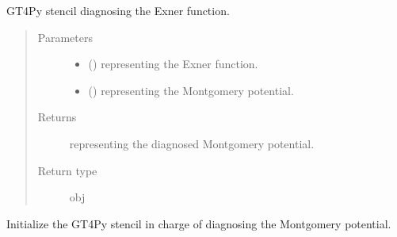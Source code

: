 \documentclass[letterpaper,10pt,english]{sphinxmanual}
\begin{document}
\begin{fulllineitems}
\begin{fulllineitems}
\begin{quote}
\begin{description}
\begin{itemize}
\end{itemize}

\end{description}\end{quote}

\end{fulllineitems}


\begin{fulllineitems}
\label{\detokenize{api:dycore.diagnostic_isentropic.DiagnosticIsentropic._stencil_diagnosing_montgomery_defs}}
GT4Py stencil diagnosing the Exner function.
\begin{quote}\begin{description}
\item[{Parameters}] \leavevmode\begin{itemize}
\item {} 
 () \textendash{}  representing the Exner function.

\item {} 
 () \textendash{}  representing the Montgomery potential.

\end{itemize}

\item[{Returns}] \leavevmode
{} representing the diagnosed Montgomery potential.

\item[{Return type}] \leavevmode
obj

\end{description}\end{quote}

\end{fulllineitems}


\begin{fulllineitems}
\label{\detokenize{api:dycore.diagnostic_isentropic.DiagnosticIsentropic._stencil_diagnosing_montgomery_initialize}}
Initialize the GT4Py stencil in charge of diagnosing the Montgomery potential.


\end{fulllineitems}
\end{fulllineitems}
\end{document}
